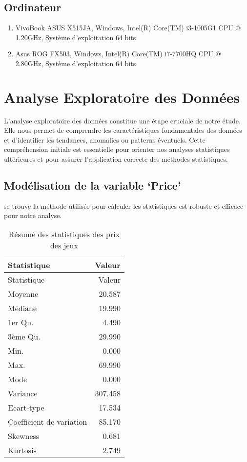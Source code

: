 \documentclass[mstat,12pt]{unswthesis}
\begin{document}
\hypertarget{ordinateur}{%
\section{Ordinateur}\label{ordinateur}}

\begin{enumerate}
\item VivoBook ASUS X515JA, Windows, Intel(R) Core(TM) i3-1005G1 CPU @ 1.20GHz, Système d’exploitation 64 bits 
\smallskip
\item Asus ROG FX503, Windows, Intel(R) Core(TM) i7-7700HQ CPU @ 2.80GHz, Système d’exploitation 64 bits
\end{enumerate}

\hypertarget{analyse-exploratoire-des-donnuxe9es}{%
\chapter{Analyse Exploratoire des
Données}\label{analyse-exploratoire-des-donnuxe9es}}

L'analyse exploratoire des données constitue une étape cruciale de notre
étude. Elle nous permet de comprendre les caractéristiques fondamentales
des données et d'identifier les tendances, anomalies ou patterns
éventuels. Cette compréhension initiale est essentielle pour orienter
nos analyses statistiques ultérieures et pour assurer l'application
correcte des méthodes statistiques.

\hypertarget{moduxe9lisation-de-la-variable-price}{%
\section{Modélisation de la variable
`Price'}\label{moduxe9lisation-de-la-variable-price}}

se trouve la méthode utilisée pour calculer les statistiques est robuste
et efficace pour notre analyse.

\begin{longtable}[]{@{}lr@{}}
\caption{Résumé des statistiques des prix des jeux}\tabularnewline
\toprule\noalign{}
Statistique & Valeur \\
\midrule\noalign{}
\endfirsthead
\toprule\noalign{}
Statistique & Valeur \\
\midrule\noalign{}
\endhead
\bottomrule\noalign{}
\endlastfoot
Moyenne & 20.587 \\
Médiane & 19.990 \\
1er Qu. & 4.490 \\
3ème Qu. & 29.990 \\
Min. & 0.000 \\
Max. & 69.990 \\
Mode & 0.000 \\
Variance & 307.458 \\
Ecart-type & 17.534 \\
Coefficient de variation & 85.170 \\
Skewness & 0.681 \\
Kurtosis & 2.749 \\
\end{longtable}
\end{document}
